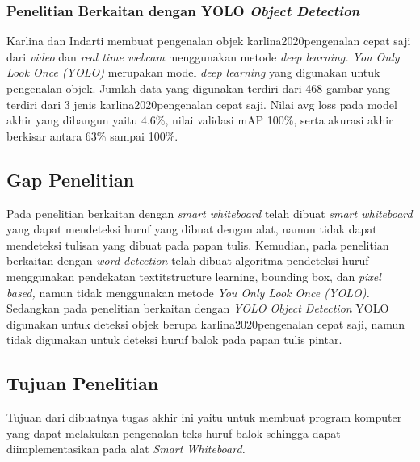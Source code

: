 \subsubsection{Penelitian Berkaitan dengan YOLO \textit{Object Detection}}
Karlina dan Indarti \citep*{karlina2020pengenalan} membuat pengenalan objek karlina2020pengenalan cepat saji dari \textit{video} dan \textit{real time webcam} menggunakan metode \textit{deep learning. You Only Look Once (YOLO)} merupakan model \textit{deep learning} yang digunakan untuk pengenalan objek. Jumlah data yang digunakan terdiri dari 468 gambar yang terdiri dari 3 jenis karlina2020pengenalan cepat saji. Nilai avg loss pada model akhir yang dibangun yaitu 4.6\%, nilai validasi mAP 100\%, serta akurasi akhir berkisar antara 63\% sampai 100\%.

\subsection{Gap Penelitian}
Pada penelitian berkaitan dengan \textit{smart whiteboard} \citep*{kellerman2018smart} telah dibuat \textit{smart whiteboard} yang dapat mendeteksi huruf yang dibuat dengan alat, namun tidak dapat mendeteksi tulisan yang dibuat pada papan tulis. Kemudian, pada penelitian berkaitan dengan \textit{word detection} \citep*{ryu2015word} \citep*{arun2019handwritten} telah dibuat algoritma pendeteksi huruf menggunakan pendekatan textit{structure learning, bounding box,} dan \textit{pixel based,} namun tidak menggunakan metode \textit{You Only Look Once (YOLO).} Sedangkan pada penelitian berkaitan dengan \textit{YOLO Object Detection} \citep*{karlina2020pengenalan} YOLO digunakan untuk deteksi objek berupa karlina2020pengenalan cepat saji, namun tidak digunakan untuk deteksi huruf balok pada papan tulis pintar.

\subsection{Tujuan Penelitian}
Tujuan dari dibuatnya tugas akhir ini yaitu untuk membuat program komputer yang dapat melakukan pengenalan teks huruf balok sehingga dapat diimplementasikan pada alat \textit{Smart Whiteboard.}